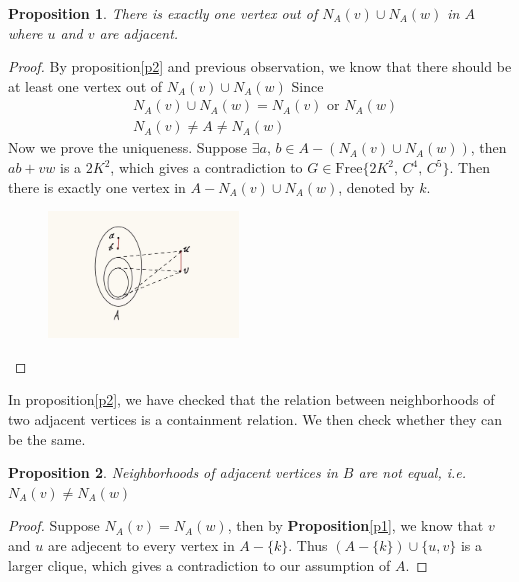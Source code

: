 \documentclass{article}
\newtheorem{prop}{\bf Proposition}
\begin{document}
    
    \begin{prop}\label{p1}
        There is exactly one vertex out of $N_A(v)\cup N_A(w)$ in $A$ where $u$ and $v$ are adjacent.
    \end{prop}

    \begin{proof}
        By proposition\eqref{p2} and previous observation, we know that there should be at least one vertex out of $N_A(v)\cup N_A(w)$ Since 
        \begin{equation*}
            \begin{split}
                &N_A(v)\cup N_A(w)=N_A(v)\text{ or }N_A(w)\\
                &N_A(v)\neq A\neq N_A(w)
            \end{split}
        \end{equation*}        
        Now we prove the uniqueness. Suppose $\exists a,\,b\in A-(N_A(v)\cup N_A(w))$, then $ab+vw$ is a $2K^2$, which gives a contradiction to $G\in\text{Free}\{2K^2,\,C^4,\,C^5\}$. Then there is exactly one vertex in $A-N_A(v)\cup N_A(w)$, denoted by $k$.
        \begin{figure}[h!]%
            \centering
            \includegraphics[width=0.45\textwidth]{pic/g2.jpg}
        \end{figure}
    \end{proof}
    
    In proposition\eqref{p2}, we have checked that the relation between neighborhoods of two adjacent vertices is a containment relation. We then check whether they can be the same.

    \begin{prop}\label{p3}
        Neighborhoods of adjacent vertices in $B$ are not equal, i.e. $N_A(v)\neq N_A(w)$        
    \end{prop}

    \begin{proof}
        Suppose $N_A(v)=N_A(w)$, then by \textbf{Proposition}\eqref{p1}, we know that $v$ and $u$ are adjecent to every vertex in $A-\{k\}$. Thus $(A-\{k\})\cup\{u,v\}$ is a larger clique, which gives a contradiction to our assumption of $A$.
    \end{proof}
    
\end{document}
